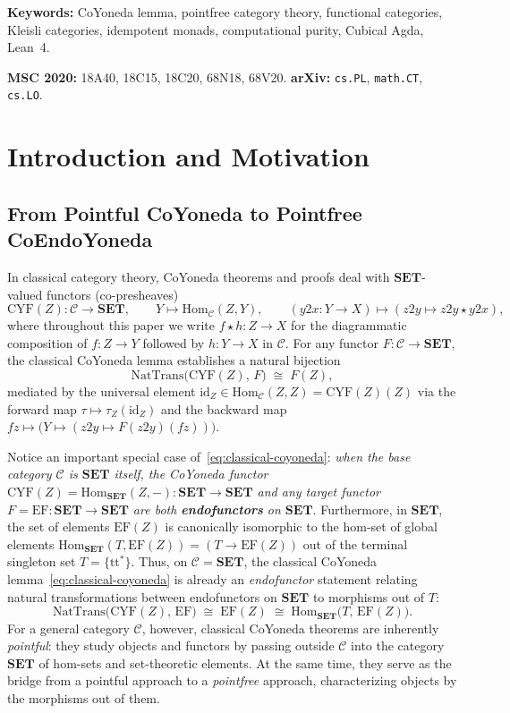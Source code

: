 \documentclass[11pt,a4paper]{article}
\theoremstyle{definition}
\theoremstyle{remark}
\newcommand{\Set}{\mathbf{SET}}
\newcommand{\Hom}{\mathrm{Hom}}
\newcommand{\NatTrans}{\mathrm{NatTrans}}
\newcommand{\id}{\mathrm{id}}
\newcommand{\CYF}{\mathrm{CYF}}
\newcommand{\EF}{\mathrm{EF}}
\newcommand{\ttstar}{\mathrm{tt}^*}
\begin{document}
\noindent \textbf{Keywords:} CoYoneda lemma, pointfree category theory, functional categories, Kleisli
categories, idempotent monads, computational purity, Cubical Agda, Lean~4.

\noindent \textbf{MSC 2020:} 18A40, 18C15, 18C20, 68N18, 68V20. \quad
\textbf{arXiv:} \texttt{cs.PL}, \texttt{math.CT}, \texttt{cs.LO}.

\newpage
\tableofcontents
\newpage

\section{Introduction and Motivation}\label{sec:intro}

\subsection{From Pointful CoYoneda to Pointfree CoEndoYoneda}

In classical category theory, CoYoneda theorems and proofs deal with $\Set$-valued functors (co-presheaves)
\[
  \CYF(Z) : \mathcal{C} \longrightarrow \Set,
  \qquad
  Y \longmapsto \Hom_{\mathcal{C}}(Z, Y),
  \qquad
  (y2x : Y \to X) \longmapsto (z2y \mapsto z2y \star y2x),
\]
where throughout this paper we write $f \star h : Z \to X$ for the diagrammatic composition of
$f : Z \to Y$ followed by $h : Y \to X$ in $\mathcal{C}$. For any functor $F : \mathcal{C} \to \Set$,
the classical CoYoneda lemma establishes a natural bijection
\begin{equation}\label{eq:classical-coyoneda}
  \NatTrans\bigl(\CYF(Z),\, F\bigr) \;\cong\; F(Z),
\end{equation}
mediated by the universal element $\id_Z \in \Hom_{\mathcal{C}}(Z, Z) = \CYF(Z)(Z)$ via the forward map
$\tau \mapsto \tau_Z(\id_Z)$ and the backward map $fz \mapsto \bigl(Y \mapsto (z2y \mapsto F(z2y)(fz))\bigr)$.

Notice an important special case of~\eqref{eq:classical-coyoneda}: \emph{when the base category
$\mathcal{C}$ is $\Set$ itself, the CoYoneda functor $\CYF(Z) = \Hom_{\Set}(Z, -) : \Set \to \Set$ and
any target functor $F = \EF : \Set \to \Set$ are both \textbf{endofunctors} on $\Set$}. Furthermore, in
$\Set$, the set of elements $\EF(Z)$ is canonically isomorphic to the hom-set of global elements
$\Hom_{\Set}(T, \EF(Z)) = (T \to \EF(Z))$ out of the terminal singleton set $T = \{\ttstar\}$. Thus, on
$\mathcal{C} = \Set$, the classical CoYoneda lemma~\eqref{eq:classical-coyoneda} is already an
\emph{endofunctor} statement relating natural transformations between endofunctors on $\Set$ to
morphisms out of $T$:
\[
  \NatTrans\bigl(\CYF(Z),\, \EF\bigr)
  \;\cong\; \EF(Z)
  \;\cong\; \Hom_{\Set}\bigl(T,\, \EF(Z)\bigr).
\]
For a general category $\mathcal{C}$, however, classical CoYoneda theorems are inherently
\emph{pointful}: they study objects and functors by passing outside $\mathcal{C}$ into the category
$\Set$ of hom-sets and set-theoretic elements. At the same time, they serve as the bridge from a
pointful approach to a \emph{pointfree} approach, characterizing objects by the morphisms out of them.
\end{document}
